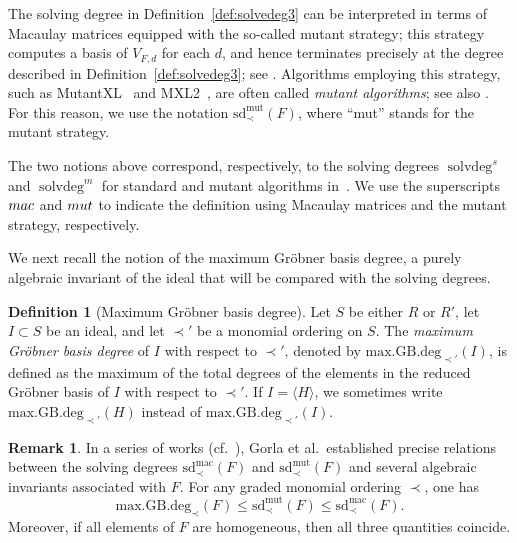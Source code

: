 \documentclass{article}
\theoremstyle{definition}
\newtheorem{definition}[theorem]{Definition}
\newtheorem{remark}[theorem]{Remark}
\theoremstyle{plain}
\theoremstyle{plain}
\theoremstyle{plain}
\theoremstyle{plain}
\numberwithin{equation}{subsection}
\begin{document}
The solving degree in Definition~\ref{def:solvedeg3} can be interpreted in terms of Macaulay matrices equipped with the so-called mutant strategy; this strategy computes a basis of $V_{F,d}$ for each $d$, and hence terminates precisely at the degree described in Definition~\ref{def:solvedeg3}; see \cite[Theorem~1]{GMP22}.
Algorithms employing this strategy, such as MutantXL~\cite{MutantXL} and MXL2~\cite{MXL2}, are often called \emph{mutant algorithms}; see also \cite{CG23,GG23-2,MXLsd}.
For this reason, we use the notation $\mathrm{sd}_{\prec}^{\mathrm{mut}}(F)$, where ``mut'' stands for the mutant strategy.

The two notions above correspond, respectively, to the solving degrees $\operatorname{solvdeg}^{s}$ and $\operatorname{solvdeg}^{m}$ for standard and mutant algorithms in~\cite{GG23-2}.
We use the superscripts ${\rm mac}$ and ${\rm mut}$ to indicate the definition using Macaulay matrices and the mutant strategy, respectively.

We next recall the notion of the maximum Gr\"obner basis degree, a purely algebraic invariant of the ideal that will be compared with the solving degrees.

\begin{definition}[Maximum Gr\"obner basis degree]\label{def:maxGBdeg}
Let $S$ be either $R$ or $R'$, let $I\subset S$ be an ideal, and let $\prec'$ be a monomial ordering on $S$.
The \emph{maximum Gr\"obner basis degree} of $I$ with respect to $\prec'$, denoted by $\mathrm{max.GB.deg}_{\prec'}(I)$, is defined as the maximum of the total degrees of the elements in the reduced Gr\"obner basis of $I$ with respect to $\prec'$.
If $I=\langle H\rangle$, we sometimes write $\mathrm{max.GB.deg}_{\prec'}(H)$ instead of $\mathrm{max.GB.deg}_{\prec'}(I)$.
\end{definition}

\begin{remark}\label{rem:inequality}
In a series of works (cf.\ \cite{CG20,BNDGMT21,GMP22,CG23,GG23-2}), Gorla et al.\ established precise relations between the solving degrees $\mathrm{sd}_{\prec}^{\mathrm{mac}}(F)$ and $\mathrm{sd}_{\prec}^{\mathrm{mut}}(F)$ and several algebraic invariants associated with $F$.
For any graded monomial ordering $\prec$, one has
\begin{equation}\label{eq:sdGB}
  \mathrm{max.GB.deg}_{\prec}(F)
  \le \mathrm{sd}_{\prec}^{\mathrm{mut}}(F)
  \le \mathrm{sd}_{\prec}^{\mathrm{mac}}(F).
\end{equation}
Moreover, if all elements of $F$ are homogeneous, then all three quantities coincide.
\end{remark}
\end{document}
